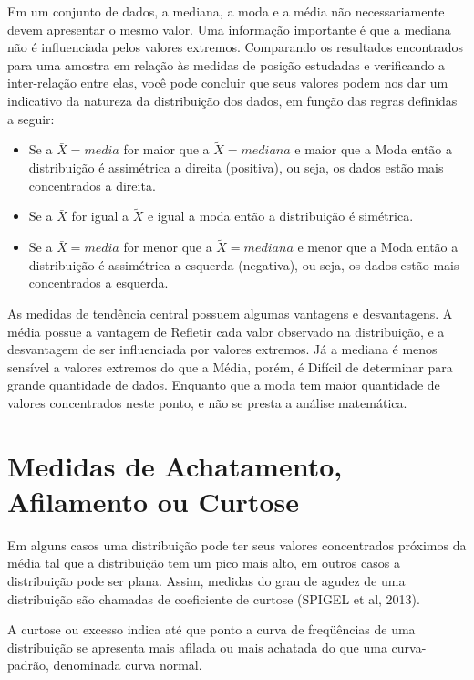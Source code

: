 \newpage 

Em um conjunto de dados, a mediana, a moda e a média
não necessariamente devem apresentar o mesmo valor. Uma
informação importante é que a mediana não é influenciada pelos valores extremos. Comparando os resultados encontrados para uma amostra em relação às medidas de posição estudadas e verificando a inter-relação entre elas, você pode concluir que seus valores podem nos dar um indicativo da natureza da distribuição dos dados, em função das regras definidas a seguir:


\begin{itemize}
\item Se a $\bar{X}=media$ for maior que a $\tilde{X}=mediana$ e maior que a Moda então a distribuição é assimétrica a direita (positiva), ou seja, os dados estão mais concentrados a direita.  	
\item Se a $\bar{X}$ for igual a $\tilde{X}$ e igual a moda então a distribuição é simétrica.
\item Se a $\bar{X}= media$ for menor que a $\tilde{X}= mediana$ e menor que a Moda então a distribuição é assimétrica a esquerda (negativa), ou seja, os dados estão mais concentrados a esquerda. 	
\end{itemize}

As medidas de tendência  central possuem algumas vantagens e desvantagens. A média possue a vantagem de Refletir cada valor observado na distribuição, e a desvantagem de ser influenciada por valores extremos. Já a mediana é menos sensível a valores extremos do que a Média, porém, é Difícil de determinar para grande quantidade de dados. Enquanto que a moda tem maior quantidade de valores concentrados neste ponto, e não se presta a análise matemática.
 
\newpage 

\section{Medidas de Achatamento, Afilamento ou Curtose }

\inic Em alguns casos uma distribuição pode ter seus valores concentrados próximos da média tal que a distribuição tem um pico mais alto, em outros casos a distribuição pode ser plana. Assim, medidas do grau de agudez de uma distribuição são chamadas de coeficiente de curtose (SPIGEL et al, 2013). \vskip0.3cm

\inic A curtose ou excesso indica até que ponto a curva de freqüências de uma distribuição se apresenta mais afilada ou mais achatada do que uma curva-padrão, denominada curva normal.\vskip0.3cm

